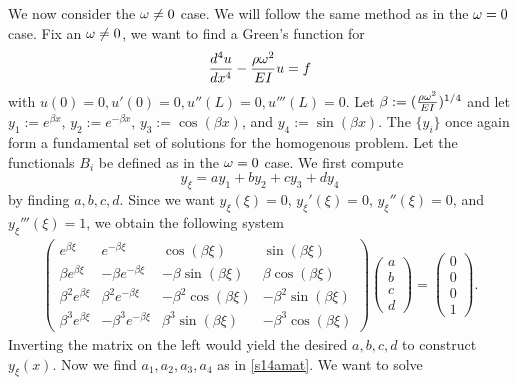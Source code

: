 We now consider the $\omega \neq 0$ case. We will follow the same method as in the $\omega = 0$ case.
Fix an $\omega \neq 0$, we want to find a Green's function for $$\frac{d^{4}u}{dx^{4}} - \frac{\rho\omega^{2}}{EI}u = f$$
with $u(0) = 0, u'(0) = 0, u''(L) = 0, u'''(L) = 0$.
Let $\beta := (\frac{\rho\omega^{2}}{EI})^{1/4}$ and let $y_{1} := e^{\beta x}$, $y_{2} := e^{-\beta x}$, $y_{3} := \cos(\beta x)$,
and $y_{4} := \sin (\beta x)$. The $\{y_{i}\}$ once again form a fundamental set of solutions for the homogenous problem. Let
the functionals $B_{i}$ be defined as in the $\omega = 0$ case. We first compute $$y_{\xi} = ay_{1} + by_{2} + cy_{3} + dy_{4}$$
by finding $a, b, c, d$. Since we want $y_{\xi}(\xi) = 0$, $y_{\xi}'(\xi) = 0$, $y_{\xi}''(\xi) = 0$, and $y_{\xi}'''(\xi) = 1$,
we obtain the following system
\begin{align}\label{s14abcd}
\begin{pmatrix}
e^{\beta\xi} & e^{-\beta\xi} & \cos(\beta \xi) & \sin(\beta \xi)\\
\beta e^{\beta \xi} & -\beta e^{-\beta \xi} & -\beta \sin(\beta \xi) & \beta \cos(\beta \xi)\\
\beta^{2}e^{\beta \xi} & \beta^{2}e^{-\beta \xi} & -\beta^{2}\cos(\beta \xi) & -\beta^{2}\sin(\beta \xi)\\
\beta^{3}e^{\beta \xi} & -\beta^{3}e^{-\beta \xi} & \beta^{3}\sin(\beta \xi) & -\beta^{3}\cos(\beta \xi)
\end{pmatrix}
\begin{pmatrix}
a\\b\\c\\d
\end{pmatrix}
=
\begin{pmatrix}
0\\0\\0\\1
\end{pmatrix}.
\end{align}
Inverting the matrix on the left would yield the desired $a, b, c, d$ to construct $y_{\xi}(x)$.
Now we find $a_{1}, a_{2}, a_{3}, a_{4}$ as in \eqref{s14amat}. We want to solve
